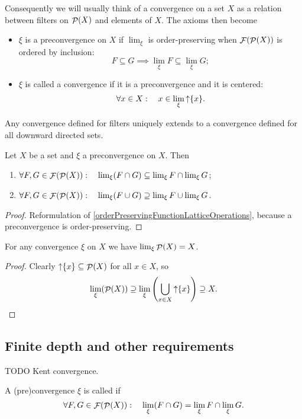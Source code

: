 Consequently we will usually think of a convergence on a set $X$ as a relation between filters on $\mathop{\mathcal{P}}(X)$ and elements of $X$. The axioms then become
\begin{itemize}
\item $\xi$ is a preconvergence on $X$ if $\lim_\xi$ is order-preserving when $\mathop{\mathcal{F}}(\mathop{\mathcal{P}}(X))$ is ordered by inclusion:
\[ F \subseteq G \implies \lim_\xi F \subseteq \lim_\xi G; \]
\item $\xi$ is called a convergence if it is a preconvergence and it is centered:
\[ \forall x\in X: \quad x\in \lim_\xi \mathop{\uparrow}\{x\}. \]
\end{itemize}

Any convergence defined for filters uniquely extends to a convergence defined for all downward directed sets. 

\begin{lemma}
Let $X$ be a set and $\xi$ a preconvergence on $X$. Then
\begin{enumerate}
\item $\forall F,G \in \mathop{\mathcal{F}}(\mathop{\mathcal{P}}(X)): \quad \lim_\xi(F\cap G) \subseteq \lim_\xi F \cap \lim_\xi G$;
\item $\forall F,G \in \mathop{\mathcal{F}}(\mathop{\mathcal{P}}(X)): \quad \lim_\xi(F\cup G) \supseteq \lim_\xi F \cup \lim_\xi G$.
\end{enumerate}
\end{lemma}
\begin{proof}
Reformulation of \ref{orderPreservingFunctionLatticeOperations}, because a preconvergence is order-preserving.
\end{proof}
\begin{corollary} \label{limitDegenerateFilter}
For any convergence $\xi$ on $X$ we have $\lim_\xi \mathop{\mathcal{P}}(X) = X$.
\end{corollary}
\begin{proof}
Clearly $\mathop{\uparrow}\{x\} \subseteq \mathop{\mathcal{P}}(X)$ for all $x\in X$, so
\[ \lim_\xi(\mathop{\mathcal{P}}(X)) \supseteq \lim_\xi \left(\bigcup_{x\in X}\mathop{\uparrow}\{x\}\right) \supseteq X. \]
\end{proof}

\subsection{Finite depth and other requirements}
TODO Kent convergence.
\begin{definition}
A (pre)convergence $\xi$ is called  if 
\[ \forall F,G \in \mathop{\mathcal{F}}(\mathop{\mathcal{P}}(X)): \quad \lim_\xi(F\cap G) = \lim_\xi F \cap \lim_\xi G. \]
\end{definition}

